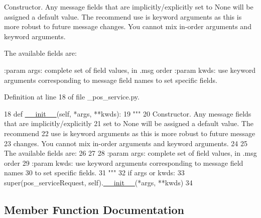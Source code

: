\begin{DoxyVerb}Constructor. Any message fields that are implicitly/explicitly
set to None will be assigned a default value. The recommend
use is keyword arguments as this is more robust to future message
changes.  You cannot mix in-order arguments and keyword arguments.

The available fields are:
   

:param args: complete set of field values, in .msg order
:param kwds: use keyword arguments corresponding to message field names
to set specific fields.
\end{DoxyVerb}
 

Definition at line 18 of file \+\_\+pos\+\_\+service.\+py.


\begin{DoxyCode}
18   \textcolor{keyword}{def }\hyperlink{classstate__machine_1_1Play_a5993a23d8be7f7b2647f71ede0334957}{\_\_init\_\_}(self, *args, **kwds):
19     \textcolor{stringliteral}{"""}
20 \textcolor{stringliteral}{    Constructor. Any message fields that are implicitly/explicitly}
21 \textcolor{stringliteral}{    set to None will be assigned a default value. The recommend}
22 \textcolor{stringliteral}{    use is keyword arguments as this is more robust to future message}
23 \textcolor{stringliteral}{    changes.  You cannot mix in-order arguments and keyword arguments.}
24 \textcolor{stringliteral}{}
25 \textcolor{stringliteral}{    The available fields are:}
26 \textcolor{stringliteral}{       }
27 \textcolor{stringliteral}{}
28 \textcolor{stringliteral}{    :param args: complete set of field values, in .msg order}
29 \textcolor{stringliteral}{    :param kwds: use keyword arguments corresponding to message field names}
30 \textcolor{stringliteral}{    to set specific fields.}
31 \textcolor{stringliteral}{    """}
32     \textcolor{keywordflow}{if} args \textcolor{keywordflow}{or} kwds:
33       super(pos\_serviceRequest, self).\hyperlink{classstate__machine_1_1Play_a5993a23d8be7f7b2647f71ede0334957}{\_\_init\_\_}(*args, **kwds)
34 
\end{DoxyCode}


\subsection{Member Function Documentation}
\mbox{\label{classass1_1_1srv_1_1__pos__service_1_1pos__serviceRequest_ad91716be46b462564eb0476ef67e3442}} 
